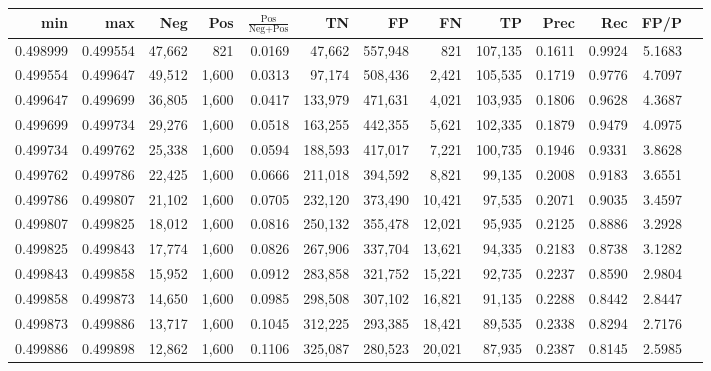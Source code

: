 \begin{tabular}{rrrrrrrrrrrrr}
\toprule
     min &      max &    Neg &   Pos & $\frac{\text{Pos}}{\text{Neg}+\text{Pos}}$ &      TN &      FP &      FN &      TP &   Prec &    Rec &   FP/P \\
\midrule
0.498999 & 0.499554 & 47,662 &   821 &                                     0.0169 &  47,662 & 557,948 &     821 & 107,135 & 0.1611 & 0.9924 & 5.1683 \\
0.499554 & 0.499647 & 49,512 & 1,600 &                                     0.0313 &  97,174 & 508,436 &   2,421 & 105,535 & 0.1719 & 0.9776 & 4.7097 \\
0.499647 & 0.499699 & 36,805 & 1,600 &                                     0.0417 & 133,979 & 471,631 &   4,021 & 103,935 & 0.1806 & 0.9628 & 4.3687 \\
0.499699 & 0.499734 & 29,276 & 1,600 &                                     0.0518 & 163,255 & 442,355 &   5,621 & 102,335 & 0.1879 & 0.9479 & 4.0975 \\
0.499734 & 0.499762 & 25,338 & 1,600 &                                     0.0594 & 188,593 & 417,017 &   7,221 & 100,735 & 0.1946 & 0.9331 & 3.8628 \\
0.499762 & 0.499786 & 22,425 & 1,600 &                                     0.0666 & 211,018 & 394,592 &   8,821 &  99,135 & 0.2008 & 0.9183 & 3.6551 \\
0.499786 & 0.499807 & 21,102 & 1,600 &                                     0.0705 & 232,120 & 373,490 &  10,421 &  97,535 & 0.2071 & 0.9035 & 3.4597 \\
0.499807 & 0.499825 & 18,012 & 1,600 &                                     0.0816 & 250,132 & 355,478 &  12,021 &  95,935 & 0.2125 & 0.8886 & 3.2928 \\
0.499825 & 0.499843 & 17,774 & 1,600 &                                     0.0826 & 267,906 & 337,704 &  13,621 &  94,335 & 0.2183 & 0.8738 & 3.1282 \\
0.499843 & 0.499858 & 15,952 & 1,600 &                                     0.0912 & 283,858 & 321,752 &  15,221 &  92,735 & 0.2237 & 0.8590 & 2.9804 \\
0.499858 & 0.499873 & 14,650 & 1,600 &                                     0.0985 & 298,508 & 307,102 &  16,821 &  91,135 & 0.2288 & 0.8442 & 2.8447 \\
0.499873 & 0.499886 & 13,717 & 1,600 &                                     0.1045 & 312,225 & 293,385 &  18,421 &  89,535 & 0.2338 & 0.8294 & 2.7176 \\
0.499886 & 0.499898 & 12,862 & 1,600 &                                     0.1106 & 325,087 & 280,523 &  20,021 &  87,935 & 0.2387 & 0.8145 & 2.5985 \\

\end{tabular}
